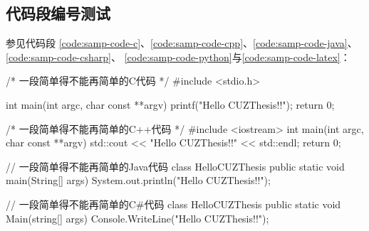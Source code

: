 \begin{appendices}
    \subsection{代码段编号测试} \label{subsec:testlistings}

    参见代码段
    \ref{code:samp-code-c}、\ref{code:samp-code-cpp}、\ref{code:samp-code-java}、\ref{code:samp-code-csharp}、
    \ref{code:samp-code-python}与\ref{code:samp-code-latex}：

    \begin{listing}[H]
        \centering
        \caption{一段简单得不能再简单的C代码}
        \label{code:samp-code-c}
        \begin{ccode}
            /* 一段简单得不能再简单的C代码 */
            #include <stdio.h>

            int main(int argc, char const **argv) {
                printf("Hello CUZThesis!!\n");
                return 0;
            }
        \end{ccode}
    \end{listing}

    \begin{listing}[H]
        \centering
        \caption{一段简单得不能再简单的C++代码}
        \label{code:samp-code-cpp}
        \begin{cppcode}
            /* 一段简单得不能再简单的C++代码 */
            #include <iostream>
            int main(int argc, char const **argv) {
                std::cout << "Hello CUZThesis!!" << std::endl;
                return 0;
            }
        \end{cppcode}
    \end{listing}

    \begin{listing}[H]
        \centering
        \caption{一段简单得不能再简单的Java代码}
        \label{code:samp-code-java}
        \begin{javacode}
            // 一段简单得不能再简单的Java代码
            class HelloCUZThesis {
                public static void main(String[] args) {
                    System.out.println("Hello CUZThesis!!");
                }
            }
        \end{javacode}
    \end{listing}

    \begin{listing}[H]
        \centering
        \caption{一段简单得不能再简单的C\#代码}
        \label{code:samp-code-csharp}
        \begin{csharpcode}
            // 一段简单得不能再简单的C#代码
            class HelloCUZThesis {
                public static void Main(string[] args) {
                    Console.WriteLine("Hello CUZThesis!!");
                }
            }
        \end{csharpcode}
    \end{listing}


\end{appendices}

